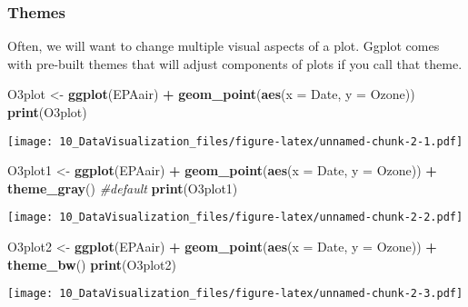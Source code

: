 \documentclass[]{article}
\newenvironment{Shaded}{\begin{snugshade}}{\end{snugshade}}
\newcommand{\KeywordTok}[1]{\textcolor[rgb]{0.13,0.29,0.53}{\textbf{#1}}}
\newcommand{\DataTypeTok}[1]{\textcolor[rgb]{0.13,0.29,0.53}{#1}}
\newcommand{\StringTok}[1]{\textcolor[rgb]{0.31,0.60,0.02}{#1}}
\newcommand{\CommentTok}[1]{\textcolor[rgb]{0.56,0.35,0.01}{\textit{#1}}}
\newcommand{\OperatorTok}[1]{\textcolor[rgb]{0.81,0.36,0.00}{\textbf{#1}}}
\newcommand{\NormalTok}[1]{#1}
\begin{document}
\subsubsection{Themes}\label{themes}

Often, we will want to change multiple visual aspects of a plot. Ggplot
comes with pre-built themes that will adjust components of plots if you
call that theme.

\begin{Shaded}
\begin{Highlighting}[]
\NormalTok{O3plot <-}\StringTok{ }\KeywordTok{ggplot}\NormalTok{(EPAair) }\OperatorTok{+}
\StringTok{  }\KeywordTok{geom_point}\NormalTok{(}\KeywordTok{aes}\NormalTok{(}\DataTypeTok{x =}\NormalTok{ Date, }\DataTypeTok{y =}\NormalTok{ Ozone)) }
\KeywordTok{print}\NormalTok{(O3plot)}
\end{Highlighting}
\end{Shaded}

\texttt{[image: 10\_DataVisualization\_files/figure-latex/unnamed-chunk-2-1.pdf]}

\begin{Shaded}
\begin{Highlighting}[]
\NormalTok{O3plot1 <-}\StringTok{ }\KeywordTok{ggplot}\NormalTok{(EPAair) }\OperatorTok{+}
\StringTok{  }\KeywordTok{geom_point}\NormalTok{(}\KeywordTok{aes}\NormalTok{(}\DataTypeTok{x =}\NormalTok{ Date, }\DataTypeTok{y =}\NormalTok{ Ozone)) }\OperatorTok{+}
\StringTok{  }\KeywordTok{theme_gray}\NormalTok{() }\CommentTok{#default}
\KeywordTok{print}\NormalTok{(O3plot1)}
\end{Highlighting}
\end{Shaded}

\texttt{[image: 10\_DataVisualization\_files/figure-latex/unnamed-chunk-2-2.pdf]}

\begin{Shaded}
\begin{Highlighting}[]
\NormalTok{O3plot2 <-}\StringTok{ }\KeywordTok{ggplot}\NormalTok{(EPAair) }\OperatorTok{+}
\StringTok{  }\KeywordTok{geom_point}\NormalTok{(}\KeywordTok{aes}\NormalTok{(}\DataTypeTok{x =}\NormalTok{ Date, }\DataTypeTok{y =}\NormalTok{ Ozone)) }\OperatorTok{+}
\StringTok{  }\KeywordTok{theme_bw}\NormalTok{()}
\KeywordTok{print}\NormalTok{(O3plot2)}
\end{Highlighting}
\end{Shaded}

\texttt{[image: 10\_DataVisualization\_files/figure-latex/unnamed-chunk-2-3.pdf]}
\end{document}
